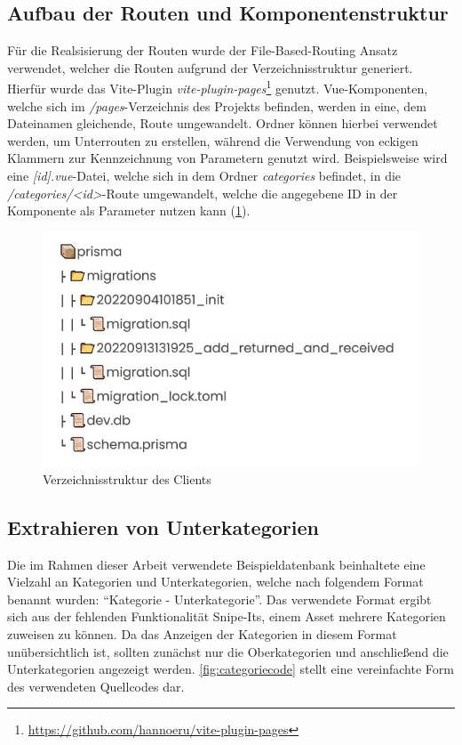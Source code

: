 \subsection{Aufbau der Routen und Komponentenstruktur}
Für die Realsisierung der Routen wurde der File-Based-Routing Ansatz verwendet, welcher die Routen
aufgrund der Verzeichnisstruktur generiert. Hierfür wurde das Vite-Plugin
\textit{vite-plugin-pages}\footnote{\url{https://github.com/hannoeru/vite-plugin-pages}} genutzt.
Vue-Komponenten, welche sich im \textit{/pages}-Verzeichnis des Projekts befinden, werden in eine,
dem Dateinamen gleichende, Route umgewandelt. Ordner können hierbei verwendet werden, um Unterrouten
zu erstellen, während die Verwendung von eckigen Klammern zur Kennzeichnung von Parametern genutzt
wird. Beispielsweise wird eine \textit{[id].vue}-Datei, welche sich
in dem Ordner \textit{categories} befindet, in die \textit{/categories/<id>}-Route umgewandelt,
welche die angegebene ID in der Komponente als Parameter nutzen kann (\ref{fig:vue}).

\begin{figure}[h]
  \centering
  \includegraphics[scale=0.7]{Bilder/Db.jpg}
  \caption[Verzeichnisstruktur des Clients]{Verzeichnisstruktur des Clients}
  \label{fig:vue}
\end{figure}

\subsection{Extrahieren von Unterkategorien}
Die im Rahmen dieser Arbeit verwendete Beispieldatenbank beinhaltete eine Vielzahl an Kategorien und
Unterkategorien, welche nach folgendem Format benannt wurden: \enquote{Kategorie - Unterkategorie}.
Das verwendete Format ergibt sich aus der fehlenden Funktionalität Snipe-Its, einem Asset mehrere
Kategorien zuweisen zu können. Da das Anzeigen der Kategorien in diesem Format unübersichtlich ist,
sollten zunächst nur die Oberkategorien und anschließend die Unterkategorien angezeigt werden.
\ref{fig:categoriecode} stellt eine vereinfachte Form des verwendeten Quellcodes dar.

